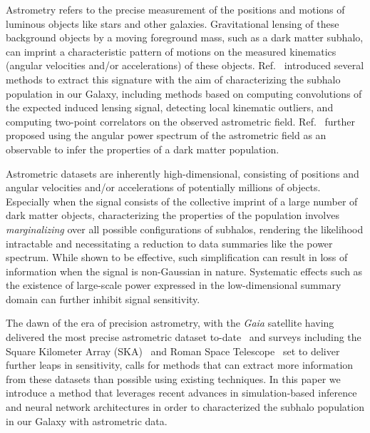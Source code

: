 \documentclass[]{article}
\begin{document}
Astrometry refers to the precise measurement of the positions and motions of luminous objects like stars and other galaxies. Gravitational lensing of these background objects by a moving foreground mass, such as a dark matter subhalo, can imprint a characteristic pattern of motions on the measured kinematics (angular velocities and/or accelerations) of these objects. Ref.~\cite{VanTilburg:2018ykj} introduced several methods to extract this signature with the aim of characterizing the subhalo population in our Galaxy, including methods based on computing convolutions of the expected induced lensing signal, detecting local kinematic outliers, and computing two-point correlators on the observed astrometric field. Ref.~\cite{Mishra-Sharma:2020ynk} further proposed using the angular power spectrum of the astrometric field as an observable to infer the properties of a dark matter population.

Astrometric datasets are inherently high-dimensional, consisting of positions and angular velocities and/or accelerations of potentially millions of objects. Especially when the signal consists of the collective imprint of a large number of dark matter objects, characterizing the properties of the population involves \emph{marginalizing} over all possible configurations of subhalos, rendering the likelihood intractable and necessitating a reduction to data summaries like the power spectrum. While shown to be effective, such simplification can result in loss of information when the signal is non-Gaussian in nature. Systematic effects such as the existence of large-scale power expressed in the low-dimensional summary domain can further inhibit signal sensitivity. 

The dawn of the era of precision astrometry, with the \emph{Gaia} satellite having delivered the most precise astrometric dataset to-date~\cite{2016A&A...595A...1G,2018A&A...616A...1G,2018A&A...616A...2L} and surveys including the Square Kilometer Array (SKA)~\cite{Fomalont:2004hr,Jarvis:2015tqa} and Roman Space Telescope~\cite{2019JATIS...5d4005W} set to deliver further leaps in sensitivity, calls for methods that can extract more information from these datasets than possible using existing techniques. In this paper we introduce a method that leverages recent advances in simulation-based inference and neural network architectures in order to characterized the subhalo population in our Galaxy with astrometric data.


\end{document}
